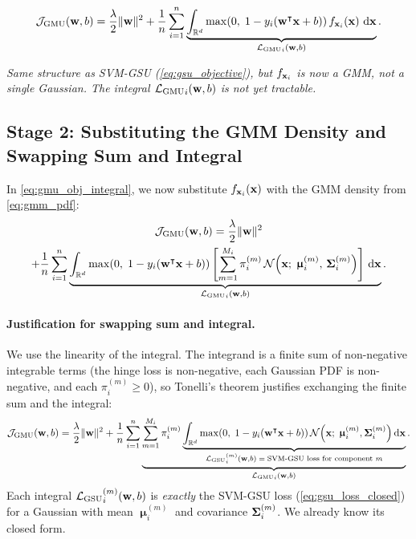 \documentclass[11pt, letterpaper]{article}
\newcommand{\bSigma}{\vb{\Sigma}}
\newcommand{\bmu}{\boldsymbol{\upmu}}
\newcommand{\R}{\mathbb{R}}
\newcommand{\loss}{\mathcal{L}}
\newcommand{\obj}{\mathcal{J}}
\newcommand{\Norm}{\mathcal{N}}
\begin{document}
\begin{statusbox}
\vspace{-0.5em}
\begin{equation*}
    \obj_{\text{GMU}}(\vb{w}, b) = \frac{\lambda}{2}\|\vb{w}\|^2 + \frac{1}{n}\sum_{i=1}^{n} \underbrace{\int_{\R^d} \max\!\left(0,\; 1 - y_i\!\left(\vb{w}^{\intercal} \vb{x} + b\right)\right) f_{\vb{x}_i}(\vb{x})\, \dd{\vb{x}}}_{{\loss_{\text{GMU}}}_{i}(\vb{w}, b)}.
\end{equation*}
\vspace{-1em}
\begin{center}\small
\emph{Same structure as SVM-GSU (\cref{eq:gsu_objective}), but $f_{\vb{x}_i}$ is now a GMM, not a single Gaussian. The integral ${\loss_{\text{GMU}}}_{i}(\vb{w}, b)$ is not yet tractable.}
\end{center}
\end{statusbox}

\subsection{Stage 2: Substituting the GMM Density and Swapping Sum and Integral}

In \cref{eq:gmu_obj_integral}, we now substitute $f_{\vb{x}_i}(\vb{x})$ with the GMM density from \cref{eq:gmm_pdf}:
\begin{multline}\label{eq:gmu_substitution}
    \obj_{\text{GMU}}(\vb{w}, b) = \frac{\lambda}{2}\|\vb{w}\|^2 \\+ \frac{1}{n}\sum_{i=1}^{n} \underbrace{\int_{\R^d} \max\!\left(0,\; 1 - y_i\!\left(\vb{w}^{\intercal} \vb{x} + b\right)\right) \left[\sum_{m=1}^{M_i} \pi_i^{(m)}\, \Norm\!\left(\vb{x};\; \bmu_i^{(m)},\, \bSigma_i^{(m)}\right)\right]\, \dd{\vb{x}}}_{{\loss_{\text{GMU}}}_{i}(\vb{w}, b)}.
\end{multline}

\paragraph{Justification for swapping sum and integral.} We use the linearity of the integral. The integrand is a finite sum of non-negative integrable terms (the hinge loss is non-negative, each Gaussian PDF is non-negative, and each $\pi_i^{(m)} \geq 0$), so Tonelli's theorem justifies exchanging the finite sum and the integral:
\begin{equation}\label{eq:gmu_swap}
    \obj_{\text{GMU}}(\vb{w}, b) = \frac{\lambda}{2}\|\vb{w}\|^2 + \frac{1}{n}\sum_{i=1}^{n}\underbrace{\sum_{m=1}^{M_i} \pi_i^{(m)} \underbrace{\int_{\R^d} \max\!\left(0,\; 1 - y_i(\vb{w}^{\intercal} \vb{x} + b)\right) \Norm\!\left(\vb{x};\; \bmu_i^{(m)}, \bSigma_i^{(m)}\right) \dd{\vb{x}}}_{{\loss_{\text{GSU}}}_{i}^{(m)}(\vb{w}, b) \;=\; \text{SVM-GSU loss for component } m}}_{{\loss_{\text{GMU}}}_{i}(\vb{w}, b)}.
\end{equation}
Each integral ${\loss_{\text{GSU}}}_{i}^{(m)}(\vb{w}, b)$ is \emph{exactly} the SVM-GSU loss (\cref{eq:gsu_loss_closed}) for a Gaussian with mean $\bmu_i^{(m)}$ and covariance $\bSigma_i^{(m)}$. We already know its closed form.
\end{document}
